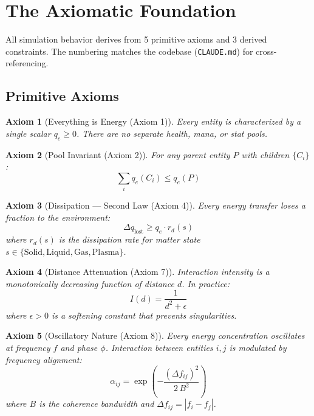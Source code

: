 \documentclass[11pt,a4paper]{article}
\newtheorem{axiom}{Axiom}
\begin{document}
\section{The Axiomatic Foundation}
\label{sec:axioms}

All simulation behavior derives from 5 primitive axioms and
3 derived constraints. The numbering matches the codebase
(\texttt{CLAUDE.md}) for cross-referencing.

\subsection{Primitive Axioms}

\begin{axiom}[Everything is Energy (Axiom 1)]
\label{ax:energy}
Every entity is characterized by a single scalar $q_e \geq 0$.
There are no separate health, mana, or stat pools.
\end{axiom}

\begin{axiom}[Pool Invariant (Axiom 2)]
\label{ax:pool}
For any parent entity $P$ with children $\{C_i\}$:
\begin{equation}
  \sum_i q_e(C_i) \leq q_e(P)
\end{equation}
\end{axiom}

\begin{axiom}[Dissipation --- Second Law (Axiom 4)]
\label{ax:dissipation}
Every energy transfer loses a fraction to the environment:
\begin{equation}
  \Delta q_{\text{lost}} \geq q_e \cdot r_d(s)
\end{equation}
where $r_d(s)$ is the dissipation rate for matter state
$s \in \{\text{Solid}, \text{Liquid}, \text{Gas}, \text{Plasma}\}$.
\end{axiom}

\begin{axiom}[Distance Attenuation (Axiom 7)]
\label{ax:distance}
Interaction intensity is a monotonically decreasing function
of distance $d$. In practice:
\begin{equation}
  I(d) = \frac{1}{d^2 + \epsilon}
\end{equation}
where $\epsilon > 0$ is a softening constant that prevents
singularities.
\end{axiom}

\begin{axiom}[Oscillatory Nature (Axiom 8)]
\label{ax:oscillatory}
Every energy concentration oscillates at frequency $f$ and phase
$\phi$. Interaction between entities $i,j$ is modulated by
frequency alignment:
\begin{equation}
  \alpha_{ij} = \exp\!\left(-\frac{(\Delta f_{ij})^2}{2\,B^2}\right)
  \label{eq:alignment}
\end{equation}
where $B$ is the coherence bandwidth and
$\Delta f_{ij} = |f_i - f_j|$.
\end{axiom}
\end{document}
